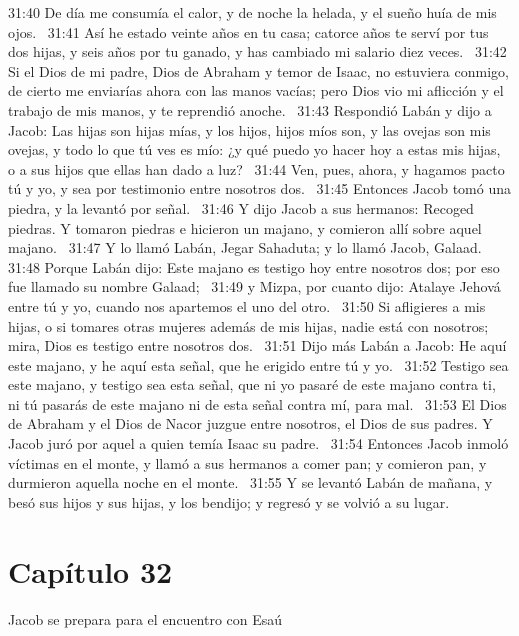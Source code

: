 31:40 De día me consumía el calor, y de noche la helada, y el sueño huía de mis ojos.  
31:41 Así he estado veinte años en tu casa; catorce años te serví por tus dos hijas, y seis años por tu ganado, y has cambiado mi salario diez veces.  
31:42 Si el Dios de mi padre, Dios de Abraham y temor de Isaac, no estuviera conmigo, de cierto me enviarías ahora con las manos vacías; pero Dios vio mi aflicción y el trabajo de mis manos, y te reprendió anoche.  
31:43 Respondió Labán y dijo a Jacob: Las hijas son hijas mías, y los hijos, hijos míos son, y las ovejas son mis ovejas, y todo lo que tú ves es mío: ¿y qué puedo yo hacer hoy a estas mis hijas, o a sus hijos que ellas han dado a luz?  
31:44 Ven, pues, ahora, y hagamos pacto tú y yo, y sea por testimonio entre nosotros dos.  
31:45 Entonces Jacob tomó una piedra, y la levantó por señal.  
31:46 Y dijo Jacob a sus hermanos: Recoged piedras. Y tomaron piedras e hicieron un majano, y comieron allí sobre aquel majano.  
31:47 Y lo llamó Labán, Jegar Sahaduta; y lo llamó Jacob, Galaad.  
31:48 Porque Labán dijo: Este majano es testigo hoy entre nosotros dos; por eso fue llamado su nombre Galaad;  
31:49 y Mizpa, por cuanto dijo: Atalaye Jehová entre tú y yo, cuando nos apartemos el uno del otro.  
31:50 Si afligieres a mis hijas, o si tomares otras mujeres además de mis hijas, nadie está con nosotros; mira, Dios es testigo entre nosotros dos.  
31:51 Dijo más Labán a Jacob: He aquí este majano, y he aquí esta señal, que he erigido entre tú y yo.  
31:52 Testigo sea este majano, y testigo sea esta señal, que ni yo pasaré de este majano contra ti, ni tú pasarás de este majano ni de esta señal contra mí, para mal.  
31:53 El Dios de Abraham y el Dios de Nacor juzgue entre nosotros, el Dios de sus padres. Y Jacob juró por aquel a quien temía Isaac su padre.  
31:54 Entonces Jacob inmoló víctimas en el monte, y llamó a sus hermanos a comer pan; y comieron pan, y durmieron aquella noche en el monte.  
31:55 Y se levantó Labán de mañana, y besó sus hijos y sus hijas, y los bendijo; y regresó y se volvió a su lugar.  
\section*{Capítulo 32}
Jacob se prepara para el encuentro con Esaú  

